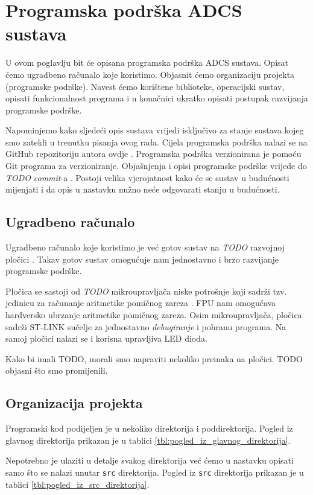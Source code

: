 \documentclass[times, utf8, diplomski, numeric]{templates/template}
\begin{document}
\chapter{Programska podrška ADCS sustava}{
    U ovom poglavlju bit će opisana programska podrška ADCS sustava. Opisat ćemo ugradbeno računalo koje koristimo. Objasnit ćemo organizaciju projekta (programske podrške). Navest ćemo korištene biblioteke, operacijski sustav, opisati funkcionalnost programa i u konačnici ukratko opisati postupak razvijanja programske podrške.

    Napominjemo kako sljedeći opis sustava vrijedi isključivo za stanje sustava kojeg smo zatekli u trenutku pisanja ovog rada. Cijela programska podrška nalazi se na GitHub repozitoriju autora ovdje \cite{github_repo}. Programska podrška verzionirana je pomoću Git \cite{git} programa za verzioniranje. Objašnjenja i opisi programske podrške vrijede do \emph{TODO} \emph{commit}-a \cite{git_commit}. Postoji velika vjerojatnost kako će se sustav u budućnosti mijenjati i da opis u nastavku nužno neće odgovarati stanju u budućnosti. 

    \section{Ugradbeno računalo}{
        Ugradbeno računalo koje koristimo je već gotov sustav na \emph{TODO} razvojnoj pločici \cite{}. Takav gotov sustav omogućuje nam jednostavno i brzo razvijanje programske podrške. 

        Pločica se sastoji od \emph{TODO} mikroupravljača niske potrošnje koji sadrži tzv. jedinicu za računanje aritmetike pomičnog zareza . FPU nam omogućava hardversko ubrzanje aritmetike pomičnog zareza. Osim mikroupravljača, pločica sadrži ST-LINK sučelje za jednostavno \emph{debugiranje} i pohranu programa. Na samoj pločici nalazi se i korisna upravljiva LED dioda.

        Kako bi imali TODO, morali smo napraviti nekoliko preinaka na pločici. TODO objasni što smo promijenili. 
    }

    \section{Organizacija projekta}{
        Programski kod podijeljen je u nekoliko direktorija i poddirektorija. Pogled iz glavnog direktorija prikazan je u tablici \ref{tbl:pogled_iz_glavnog_direktorija}.

        Nepotrebno je ulaziti u detalje svakog direktorija već ćemo u nastavku opisati samo što se nalazi unutar \texttt{src} direktorija. Pogled iz \texttt{src} direktorija prikazan je u tablici \ref{tbl:pogled_iz_src_direktorija}.

}}
\end{document}
